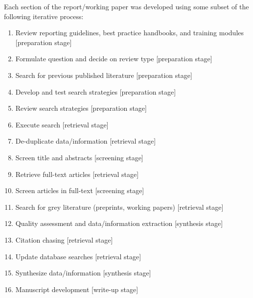 \documentclass[11pt]{article}
\begin{document}
Each section of the report/working paper was developed using some subset of the following iterative process\autocite{tsafnat14}:
\begin{enumerate}
    \item Review reporting guidelines, best practice handbooks, and training modules [preparation stage]
    \item Formulate question and decide on review type [preparation stage]
    \item Search for previous published literature [preparation stage]
    \item Develop and test search strategies [preparation stage]
    \item Review search strategies [preparation stage]
    \item Execute search [retrieval stage]
    \item De-duplicate data/information [retrieval stage]
    \item Screen title and abstracts [screening stage]
    \item Retrieve full-text articles [retrieval stage]
    \item Screen articles in full-text [screening stage]
    \item Search for grey literature (preprints, working papers) [retrieval stage]
    \item Quality assessment and data/information extraction [synthesis stage]
    \item Citation chasing [retrieval stage]
    \item Update database searches [retrieval stage]
    \item Synthesize data/information [synthesis stage]
    \item Manuscript development [write-up stage]
\end{enumerate}
\end{document}

